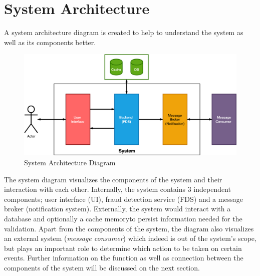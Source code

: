 \section{System Architecture}

A system architecture diagram is created to help to understand the system as well as its components better. 

\begin{figure}[h]
 \includegraphics[width=\textwidth]{diagrams/system.png}
 \caption{System Architecture Diagram}
\end{figure}
 
The system diagram visualizes the components of the system and their interaction with each other. Internally, the system contains 3 independent components; user interface (UI), fraud detection service (FDS) and a message broker (notification system). 
Externally, the system would interact with a database and optionally a cache memory\footnotemark  to persist information needed for the validation. Apart from the components of the system, the diagram also visualizes an external system (\emph{message consumer}) which  indeed is out of the system's scope, but plays an important role to determine which action to be taken on certain events. Further information on the function as well as connection between the components of the system will be discussed on the next section.

